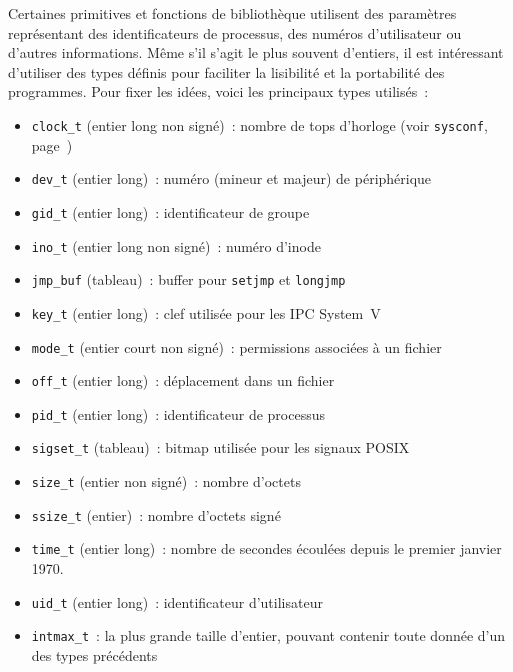 \documentclass [twoside] {report}
\begin{document}
Certaines primitives et fonctions de bibliothèque utilisent des paramètres
représentant des identificateurs de processus, des numéros d'utilisateur
ou d'autres informations.  Même s'il s'agit le plus souvent d'entiers,
il est intéressant d'utiliser des types définis pour faciliter la
lisibilité et la portabilité des programmes. Pour fixer les idées, voici
les principaux types utilisés~:

\begin {itemize}
    \item \texttt {clock\_t} (entier long non signé)~: nombre de tops
	d'horloge (voir \texttt {sysconf}, page~\pageref {sysconf})
    \item \texttt {dev\_t} (entier long)~: numéro (mineur et majeur) de
	périphérique
    \item \texttt {gid\_t} (entier long)~: identificateur de groupe
    \item \texttt {ino\_t} (entier long non signé)~: numéro d'inode
    \item \texttt {jmp\_buf} (tableau)~: buffer pour \texttt {setjmp} et
	\texttt {longjmp}
    \item \texttt {key\_t} (entier long)~: clef utilisée pour les IPC System~V
    \item \texttt {mode\_t} (entier court non signé)~: permissions associées
	à un fichier
    \item \texttt {off\_t} (entier long)~: déplacement dans un fichier
    \item \texttt {pid\_t} (entier long)~: identificateur de processus
    \item \texttt {sigset\_t} (tableau)~: bitmap utilisée pour les signaux POSIX
    \item \texttt {size\_t} (entier non signé)~: nombre d'octets
    \item \texttt {ssize\_t} (entier)~: nombre d'octets signé
    \item \texttt {time\_t} (entier long)~: nombre de secondes écoulées
	depuis le premier janvier 1970.
    \item \texttt {uid\_t} (entier long)~: identificateur d'utilisateur
    \item \texttt {intmax\_t}~: la plus grande taille d'entier,
	pouvant contenir toute donnée d'un des types précédents

\end {itemize}



\end{document}
